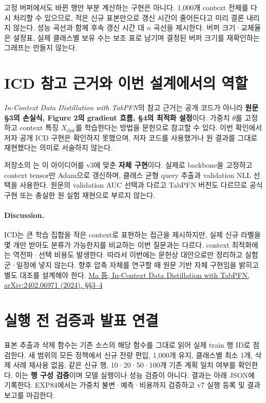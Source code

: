 고정 버퍼에서도 바뀐 행만 부분 계산하는 구현은 아니다. 1,000개 context 전체를 다시 처리할 수 있으므로, 적은 신규 표본만으로 갱신 시간이 줄어든다고 미리 결론 내리지 않는다. 성능 곡선과 함께 후속 갱신 시간 대 $n$ 곡선을 제시한다. 버퍼 크기·교체율은 설정표, 실제 클래스별 보유 수는 보조 표로 남기며 결정된 버퍼 크기를 재확인하는 그래프는 만들지 않는다.

\section{ICD 참고 근거와 이번 설계에서의 역할}
\emph{In-Context Data Distillation with TabPFN}의 참고 근거는 공개 코드가 아니라 \textbf{원문 §3의 손실식, Figure 2의 gradient 흐름, §4의 최적화 설정}이다. 가중치 $\theta$를 고정하고 context 특징 $X_{\mathrm{dist}}$를 학습한다는 방법을 문헌으로 참고할 수 있다. 이번 확인에서 저자 공개 ICD 구현은 확인하지 못했으며, 저자 코드를 사용했거나 원 결과를 그대로 재현했다는 의미로 서술하지 않는다.

저장소의 는 이 아이디어를 v3에 맞춘 \textbf{자체 구현}이다. 실제로 backbone을 고정하고 context tensor만 Adam으로 갱신하며, 클래스 균형 query 추출과 validation NLL 선택을 사용한다. 원문의 validation AUC 선택과 다르고 TabPFN 버전도 다르므로 공식 구현 또는 충실한 원 실험 재현으로 부르지 않는다.

\paragraph{Discussion.}
ICD는 큰 학습 집합을 작은 context로 표현하는 접근을 제시하지만, 실제 신규 라벨을 몇 개만 받아도 분류가 가능한지를 비교하는 이번 질문과는 다르다. context 최적화에는 역전파·선택 비용도 발생한다. 따라서 이번에는 문헌상 대안으로만 정리하고 실험군·일정에 넣지 않는다. 향후 압축 자체를 연구할 때 원문 기반 자체 구현임을 밝히고 별도 대조를 설계해야 한다.
\href{https://arxiv.org/html/2402.06971}{Ma 등, In-Context Data Distillation with TabPFN, arXiv:2402.06971 (2024), §§3--4}

\section{실행 전 검증과 발표 연결}
표본 추출과 삭제 함수는 기존 소스의 해당 함수를 그대로 읽어 실제 train 행 ID로 점검한다. 새 범위의 모든 정책에서 신규 전량 편입, 1,000개 유지, 클래스별 최소 1개, 삭제 사례 재사용 없음, 같은 신규 행, 10·20·50·100개 기존 계획 일치 여부를 확인한다. 이는 \textbf{행 구성 검증}이며 모델 실행이나 성능 검증이 아니다. 결과는 아래 JSON에 기록한다. EXP84에서는 가중치 불변·예측·비용까지 검증하고 v7 실행 등록 및 결과 보고를 마감한다.

